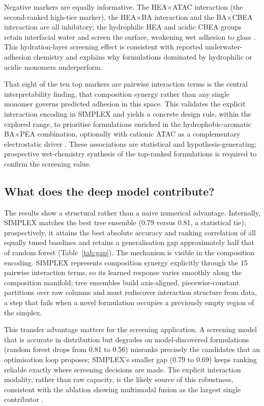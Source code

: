 \documentclass[utf8]{FrontiersinHarvard}
\newcommand{\Tref}[1]{Table~\hyperref[#1]{\ref{#1}}}
\begin{document}
Negative markers are equally informative. The HEA$\times$ATAC interaction (the second-ranked high-tier marker), the HEA$\times$BA interaction and the BA$\times$CBEA interaction are all inhibitory; the hydrophilic HEA and acidic CBEA groups retain interfacial water and screen the surface, weakening wet adhesion to glass \cite{zhang2022hydrationextent,valle2005hydrationforces,hommer2009polycarboxylate,narayanan2021underwater}. This hydration-layer screening effect is consistent with reported underwater-adhesion chemistry and explains why formulations dominated by hydrophilic or acidic monomers underperform.

That eight of the ten top markers are pairwise interaction terms is the central interpretability finding, that composition synergy rather than any single monomer governs predicted adhesion in this space. This validates the explicit interaction encoding in SIMPLEX and yields a concrete design rule, within the explored range, to prioritise formulations enriched in the hydrophobic-aromatic BA$\times$PEA combination, optionally with cationic ATAC as a complementary electrostatic driver \cite{cai2021bioadhesives,fan2019cationicaromatic}. These associations are statistical and hypothesis-generating; prospective wet-chemistry synthesis of the top-ranked formulations is required to confirm the screening value.

\subsection{What does the deep model contribute?}

The results show a structural rather than a naive numerical advantage. Internally, SIMPLEX matches the best tree ensemble (0.79 versus 0.81, a statistical tie); prospectively, it attains the best absolute accuracy and ranking correlation of all equally tuned baselines and retains a generalisation gap approximately half that of random forest (\Tref{tab:gap}). The mechanism is visible in the composition encoding. SIMPLEX represents composition synergy explicitly through the 15 pairwise interaction terms, so its learned response varies smoothly along the composition manifold; tree ensembles build axis-aligned, piecewise-constant partitions over raw columns and must rediscover interaction structure from data, a step that fails when a novel formulation occupies a previously empty region of the simplex.

This transfer advantage matters for the screening application. A screening model that is accurate in distribution but degrades on model-discovered formulations (random forest drops from 0.81 to 0.56) misranks precisely the candidates that an optimisation loop proposes; SIMPLEX's smaller gap (0.79 to 0.69) keeps ranking reliable exactly where screening decisions are made. The explicit interaction modality, rather than raw capacity, is the likely source of this robustness, consistent with the ablation showing multimodal fusion as the largest single contributor \cite{kim2023smallML,agrawal2016mlmaterials,isayev2017mlmaterials,ward2018mlcomposite,recent2022rao,recent2021mishin,recent2025li,recent2022shokrollah,recent2023kibrete}.
\end{document}
